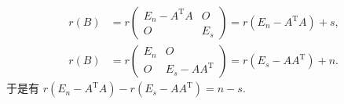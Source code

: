 \documentclass[UTF8,12pt,a4paper,fontset=fandol]{ctexart}
\begin{document}
\begin{solve}
            \begin{align*}
                r(B) &= r\begin{pmatrix}
                    E_n - A^\mathrm{T}A & O   \\
                    O                   & E_s
                \end{pmatrix} = r(E_n - A^\mathrm{T}A) + s, \\
                r(B) &= r\begin{pmatrix}
                    E_n & O                   \\
                    O   & E_s - AA^\mathrm{T}
                \end{pmatrix} = r(E_s - AA^\mathrm{T}) + n.
            \end{align*}
            于是有 $r(E_n-A^\mathrm{T}A)-r(E_s-AA^\mathrm{T})=n-s$.
\end{solve}
\end{document}

